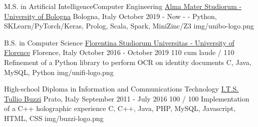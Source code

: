 
\begin{cventries}

  \logocventry
    {M.S. in Artificial Intelligence{\enskip\cdotp\enskip}Computer Engineering}
    {\href{https://www.unibo.it/en/homepage}{Alma Mater Studiorum - University of Bologna}}
    {Bologna, Italy}
    {October 2019 - Now}
    {
      \cvedu
        {-}
        {-}
        {Python, SKLearn/PyTorch/Keras, Prolog, Scala, Spark, MiniZinc/Z3}
    }
    {img/unibo-logo.png}

  \logocventry
    {B.S. in Computer Science}
    {\href{https://www.unifi.it/}{Florentina Studiorum Universitas - University of Florence}}
    {Florence, Italy}
    {October 2016 - October 2019}
    {
      \cvedu
        {110 cum laude / 110}
        {Refinement of a Python library to perform OCR on identity documents}
        {C, Java, MySQL, Python}
    }
    {img/unifi-logo.png}

  \logocventry
    {High-school Diploma in Information and Communications Technology}
    {\href{https://www.tulliobuzzi.edu.it/}{I.T.S. Tullio Buzzi}}
    {Prato, Italy}
    {September 2011 - July 2016}
    {
      \cvedu
        {100 / 100}
        {Implementation of a C++ holographic experience}
        {C, C++, Java, PHP, MySQL, Javascript, HTML, CSS}
    }
    {img/buzzi-logo.png}

\end{cventries}

